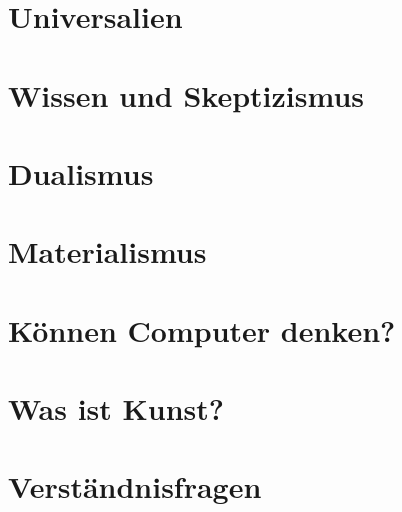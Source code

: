 \documentclass[12pt]{report}
\begin{document}
\chapter{Universalien}


\chapter{Wissen und Skeptizismus}


\chapter{Dualismus}


\chapter{Materialismus}


\chapter{Können Computer denken?}


\chapter{Was ist Kunst?}


\chapter{Verständnisfragen}

\end{document}
